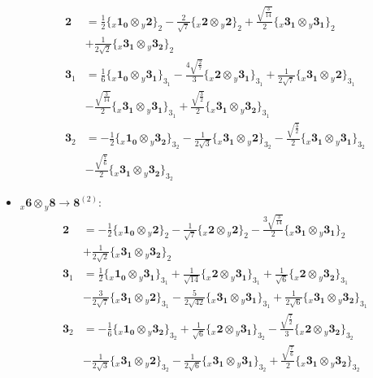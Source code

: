 \documentclass[english]{article}
\newcommand{\rep}[1]{\mathbf{#1}}
\newcommand{\repx}[2]{{}_{#2}\mathbf{#1}}
\newcommand{\subcg}[3]{\big\{ \repx{#1}{x}\otimes\repx{#2}{y}\big\}^{}_{#3}}
\begin{document}
\begin{itemize}
\begin{align*}
\rep{2} & = \frac{1}{2}\subcg{1_{0}}{2}{2}-\frac{2}{\sqrt{7}}\subcg{2}{2}{2}+\frac{\sqrt{\frac{3}{14}}}{2}\subcg{3_{1}}{3_{1}}{2} \\ 
 & +\frac{1}{2 \sqrt{2}}\subcg{3_{1}}{3_{2}}{2}
\\
\rep{3}_{1} & = \frac{1}{6}\subcg{1_{0}}{3_{1}}{3_{1}}-\frac{4 \sqrt{\frac{2}{7}}}{3}\subcg{2}{3_{1}}{3_{1}}+\frac{1}{2 \sqrt{7}}\subcg{3_{1}}{2}{3_{1}} \\ 
 & -\frac{\sqrt{\frac{3}{14}}}{2}\subcg{3_{1}}{3_{1}}{3_{1}}+\frac{\sqrt{\frac{3}{2}}}{2}\subcg{3_{1}}{3_{2}}{3_{1}}
\\
\rep{3}_{2} & = -\frac{1}{2}\subcg{1_{0}}{3_{2}}{3_{2}}-\frac{1}{2 \sqrt{3}}\subcg{3_{1}}{2}{3_{2}}-\frac{\sqrt{\frac{3}{2}}}{2}\subcg{3_{1}}{3_{1}}{3_{2}} \\ 
 & -\frac{\sqrt{\frac{7}{6}}}{2}\subcg{3_{1}}{3_{2}}{3_{2}}
\end{align*}
\item $\repx{6}{x}\otimes\repx{8}{y}\to\rep{8}^{(2)}$:
\begin{align*}
\rep{2} & = -\frac{1}{2}\subcg{1_{0}}{2}{2}-\frac{1}{\sqrt{7}}\subcg{2}{2}{2}-\frac{3 \sqrt{\frac{3}{14}}}{2}\subcg{3_{1}}{3_{1}}{2} \\ 
 & +\frac{1}{2 \sqrt{2}}\subcg{3_{1}}{3_{2}}{2}
\\
\rep{3}_{1} & = \frac{1}{2}\subcg{1_{0}}{3_{1}}{3_{1}}+\frac{1}{\sqrt{14}}\subcg{2}{3_{1}}{3_{1}}+\frac{1}{\sqrt{6}}\subcg{2}{3_{2}}{3_{1}} \\ 
 & -\frac{3}{2 \sqrt{7}}\subcg{3_{1}}{2}{3_{1}}-\frac{5}{2 \sqrt{42}}\subcg{3_{1}}{3_{1}}{3_{1}}+\frac{1}{2 \sqrt{6}}\subcg{3_{1}}{3_{2}}{3_{1}}
\\
\rep{3}_{2} & = -\frac{1}{6}\subcg{1_{0}}{3_{2}}{3_{2}}+\frac{1}{\sqrt{6}}\subcg{2}{3_{1}}{3_{2}}-\frac{\sqrt{\frac{7}{2}}}{3}\subcg{2}{3_{2}}{3_{2}} \\ 
 & -\frac{1}{2 \sqrt{3}}\subcg{3_{1}}{2}{3_{2}}-\frac{1}{2 \sqrt{6}}\subcg{3_{1}}{3_{1}}{3_{2}}+\frac{\sqrt{\frac{7}{6}}}{2}\subcg{3_{1}}{3_{2}}{3_{2}}
\end{align*}
\end{itemize}
\end{document}
